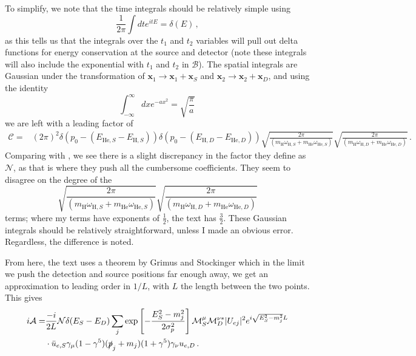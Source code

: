 \documentclass[10pt]{article}
\begin{document}
To simplify, we note that the time integrals should be relatively simple using 
\begin{equation}
  \frac{1}{2\pi}\int dt e^{itE} = \delta(E) \, ,
\end{equation}
as this tells us that the integrals over the $t_{1}$ and $t_{2}$ variables will pull out delta functions for energy conservation at the source and detector (note these integrals will also include the exponential with $t_{1}$ and $t_{2}$ in $\mathcal{B}$). The spatial integrals are Gaussian under the transformation of $\bm{x}_{1} \to \bm{x}_{1} + \bm{x}_{S}$ and $\bm{x}_{2} \to \bm{x}_{2} + \bm{x}_{D}$, and using the identity
\begin{equation}
  \int_{-\infty}^{\infty} dx e^{-ax^{2}} = \sqrt{\frac{\pi}{a}}\,
\end{equation}
we are left with a leading factor of
\begin{align*}
  \mathcal{C} = & (2\pi)^{2}\delta(p_{0} - (E_{\text{He},S} - E_{\text{H},S}))\delta(p_0 - (E_{\text{H},D} - E_{\text{He},D}))\sqrt{\frac{2\pi}{(m_{\text{H}}\omega_{\text{H},S} + m_{\text{He}}\omega_{\text{He},S})}}\sqrt{\frac{2\pi}{(m_{\text{H}}\omega_{\text{H},D} + m_{\text{He}}\omega_{\text{He},D})}}\, .  
\end{align*}
Comparing with \cite{Akhmedov_2008}, we see there is a slight discrepancy in the factor they define as $\mathcal{N}$, as that is where they push all the cumbersome coefficients. They seem to disagree on the degree of the
\[ \sqrt{\frac{2\pi}{(m_{\text{H}}\omega_{\text{H},S} + m_{\text{He}}\omega_{\text{He},S})}}\sqrt{\frac{2\pi}{(m_{\text{H}}\omega_{\text{H},D} + m_{\text{He}}\omega_{\text{He},D})}} \]
terms; where my terms have exponents of $\frac{1}{2}$, the text has $\frac{3}{2}$. These Gaussian integrals should be relatively straightforward, unless I made an obvious error. Regardless, the difference is noted.

From here, the text \cite{Akhmedov_2008} uses a theorem by Grimus and Stockinger \cite{Grim} which in the limit we push the detection and source positions far enough away, we get an approximation to leading order in $1/L$, with $L$ the length between the two points. This gives
\begin{align*}
  i\mathcal{A} = & \frac{-i}{2L}\mathcal{N}\delta(E_{S} - E_{D})\sum_{j}\exp\left[-\frac{E_{S}^{2} - m_{j}^{2}}{2\sigma^{2}_{p}}\right]\mathcal{M}_{S}^{\mu}\mathcal{M}_{D}^{\nu *}|U_{ej}|^{2}e^{i\sqrt{E_{S}^{2} - m_{j}^{2}}L} \\
  & \cdot \bar{u}_{e,S}\gamma_{\mu}(1-\gamma^{5})(\slashed{p}_{j} + m_{j})(1 + \gamma^{5})\gamma_{\nu}u_{e,D}\, .
\end{align*}
\end{document}
